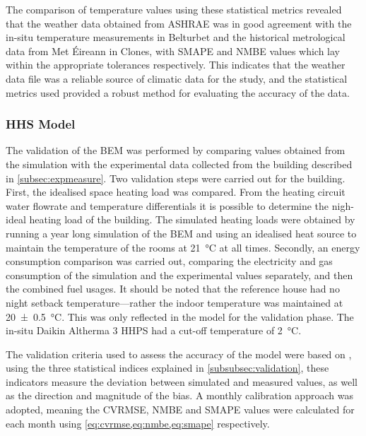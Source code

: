 The comparison of temperature values using these statistical metrics revealed that the weather data obtained from ASHRAE was in good agreement with the in-situ temperature measurements in Belturbet and the historical metrological data from Met Éireann in Clones, with \ac{SMAPE} and \ac{NMBE} values which lay within the appropriate tolerances respectively. This indicates that the weather data file was a reliable source of climatic data for the study, and the statistical metrics used provided a robust method for evaluating the accuracy of the data. 

\subsubsection{HHS Model}

The validation of the \ac{BEM} was performed by comparing values obtained from the simulation with the experimental data collected from the building described in \cref{subsec:expmeasure}. Two validation steps were carried out for the building. First, the idealised space heating load was compared. From the heating circuit water flowrate and temperature differentials it is possible to determine the nigh-ideal heating load of the building. The simulated heating loads were obtained by running a year long simulation of the \ac{BEM} and using an idealised heat source to maintain the temperature of the rooms at \qty{21}{\celsius} at all times. Secondly, an energy consumption comparison was carried out, comparing the electricity and gas consumption of the simulation and the experimental values separately, and then the combined fuel usages. It should be noted that the reference house had no night setback temperature---rather the indoor temperature was maintained at \SI[separate-uncertainty = true]{20(0.5)}{\celsius}. This was only reflected in the \modelica model for the validation phase. The in-situ Daikin Altherma 3 \ac{HHPS} had a cut-off temperature of \qty{2}{\celsius}.

The validation criteria used to assess the accuracy of the model were based on   \cite{ashrae_guideline_project_committee_14_ashrae_2014}, using the three statistical indices explained in \cref{subsubsec:validation}, these indicators measure the deviation between simulated and measured values, as well as the direction and magnitude of the bias. A monthly calibration approach was adopted, meaning the \ac{CVRMSE}, \ac{NMBE} and \ac{SMAPE} values were calculated for each month using \cref{eq:cvrmse,eq:nmbe,eq:smape} respectively. 

